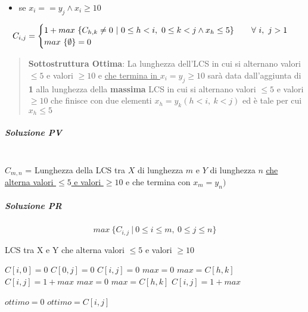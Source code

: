 \documentclass[12pt]{article}
\begin{document}
\begin{itemize}
    \item se $x_i == y_j \land x_i\geq 10 $
\end{itemize}
\[
    C_{i, j}=\begin{cases}
        1 + max \ \{C_{h, k}\neq 0 \ | \ 0 \leq h<i, \ 0 \leq k<j \land x_h \leq 5\}$ \hspace{0.5cm} $\forall \ i, \ j>1 \\
        max \ \{\emptyset\} = 0
    \end{cases}
\]
\begin{quote}
    \textbf{Sottostruttura Ottima}: La lunghezza dell'LCS in cui si alternano valori $\leq 5$ e valori $\geq 10$ e \underline{che termina in $x_i = y_j \geq 10$} sarà data dall'aggiunta di \textbf{1} alla lunghezza della \textbf{massima} LCS in cui si alternano valori $\leq 5$ e valori $\geq 10$ che finisce con due elementi $x_h=y_k (h<i, \ k<j)$ ed è tale per cui $x_h \leq 5$
\end{quote}
\subparagraph{Soluzione PV}\mbox{}\\
$C_{m,n}$ = Lunghezza della LCS tra $X$ di lunghezza $m$ e $Y$ di lunghezza $n$ \underline{che alterna valori $\leq 5$ e valori $\geq 10$} e che termina con $x_m =y_n)$
\subparagraph{Soluzione PR}
$$max \ \{C_{i,j} \ | \ 0\leq i \leq m, \ 0\leq j \leq n\}$$

\begin{algorithm}
    \caption{LCS tra X e Y che alterna valori $\leq 5$ e valori $\geq 10$}
    \begin{algorithmic}[1]
        \STATE $C[i, 0]=0$
        \ENDFOR
        \STATE $C[0, j]=0$
        \ENDFOR
        \STATE $C[i,j]=0$
        \ENDIF
        \STATE $max=0$
        \STATE $max = C[h,k]$
        \ENDIF
        \ENDFOR
        \ENDFOR
        \STATE $C[i,j]=1+max$
        \ENDIF
        \STATE $max=0$
        \STATE $max = C[h,k]$
        \ENDIF
        \ENDFOR
        \ENDFOR
        \STATE $C[i,j]=1+max$
        \ENDIF
        \ENDFOR
        \ENDFOR
    \end{algorithmic}
\end{algorithm}
\begin{algorithm}
    \begin{algorithmic}
        \STATE $ottimo=0$
        \STATE $ottimo = C[i,j]$
        \ENDIF
        \ENDFOR
        \ENDFOR
    \end{algorithmic}
\end{algorithm}
\FloatBarrier
\mbox{}\\
\newpage
\end{document}
